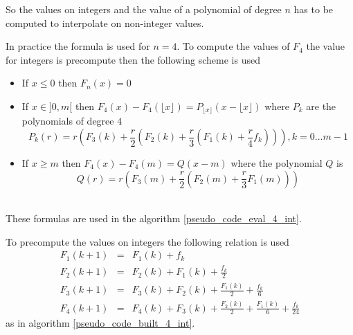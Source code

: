 
So the values on integers and the value of a polynomial of degree $n$ has to be computed to interpolate on non-integer values.

In practice the formula is used for $n=4$. To compute the values of $F_4$ the value for integers is precompute then the following scheme is used


\begin{itemize}
\item If $x\le 0$ then $F_{n}(x)=0$
\item If $x\in ]0 , m[$ then $F_{4}(x)-F_{4}(\lfloor x \rfloor)=P_{\lfloor x \rfloor}(x-\lfloor x \rfloor)$ where $P_k$ are the polynomials of degree $4$
\begin{equation*}
P_k (r) =r \left( F_{3}(k) +\frac{r}{2} \left(F_{2}(k)+ \frac{r}{3}\left(F_{1}(k)+\frac{r}{4} f_{k}\right)\right)\right), k=0...m-1
\end{equation*}
\item If $x\ge m$ then $F_{4}(x)-F_{4}(m)=Q(x-m)$ where the polynomial $Q$ is
\begin{equation*}
Q(r)=r \left(F_{3}(m)+\frac{r}{2} \left( F_{2}(m) + \frac{r}{3} F_1 (m)\right)\right)
\end{equation*}\
\end{itemize}

These formulas are used in the algorithm \ref{pseudo_code_eval_4_int}.

To precompute the values on integers the following relation is used 
\begin{eqnarray*}
F_{1}(k+1)&=&  F_{1}(k)+f_{k}  \\
F_{2}(k+1)&=&  F_{2}(k)+F_{1}(k)+\frac{f_{k}}{2}   \\
F_{3}(k+1)&=&  F_{3}(k)+F_{2}(k)+\frac{F_{1}(k)}{2}+\frac{f_{k}}{6}   \\
F_{4}(k+1)&=&  F_{4}(k)+F_{3}(k)+\frac{F_{2}(k)}{2}+\frac{F_{1}(k)}{6}+\frac{f_{k}}{24}  
\end{eqnarray*}
as in algorithm \ref{pseudo_code_built_4_int}.



